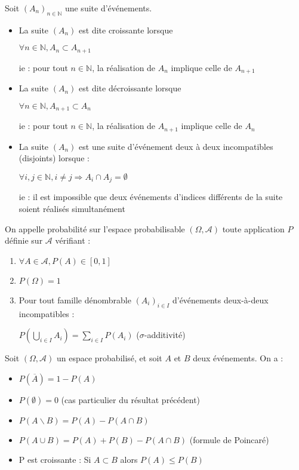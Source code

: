 \documentclass[a4paper,12pt]{book}
\newcommand{\Def}[2]{\begin{tcolorbox}[colback=white,colframe=red!10!green!20!blue!75!, title=Définition : #1]#2\end{tcolorbox}}
\newcommand{\Thr}[2]{\begin{tcolorbox}[sharp corners, colback=white,colframe=red!10!blue!30!green!75!, title=Théorème : #1]#2\end{tcolorbox}}
\def\N{\mathbb{N}}
\begin{document}
\Def{}{Soit $(A_n)_{n\in\N}$ une suite d'événements.\begin{itemize}
\item La suite $(A_n)$ est dite croissante lorsque \par\begin{center}$\forall n\in\N, A_n\subset A_{n+1}$\end{center} \par ie : pour tout $n\in\N$, la réalisation de $A_n$ implique celle de $A_{n+1}$
\item La suite $(A_n)$ est dite décroissante lorsque \par\begin{center}$\forall n\in\N, A_{n+1}\subset A_{n}$\end{center} \par ie : pour tout $n\in\N$, la réalisation de $A_{n+1}$ implique celle de $A_{n}$
\item La suite $(A_n)$ est une suite d'événement deux à deux incompatibles (disjoints) lorsque : \par\begin{center}$\forall i,j\in\N, i\neq j\Rightarrow A_i\cap A_j=\emptyset$\end{center} \par ie : il est impossible que deux événements d'indices différents de la suite soient réalisés simultanément
\end{itemize}}
\Def{}{On appelle probabilité sur l'espace probabilisable $(\Omega,\mathcal{A})$ toute application $P$ définie sur $\mathcal{A}$ vérifiant :\begin{enumerate}
\item $\forall A\in\mathcal{A}, P(A)\in [0,1]$
\item $P(\Omega)=1$
\item Pour tout famille dénombrable $(A_i)_{i\in I}$ d'événements deux-à-deux incompatibles : \par\begin{center}$P\left(\bigcup_{i\in I}A_i\right)=\sum\limits_{i\in I}P(A_i)$ ($\sigma$-additivité)\end{center}
\end{enumerate}}
\Thr{}{Soit $(\Omega,\mathcal{A})$ un espace probabilisé, et soit $A$ et $B$ deux événements. On a :\begin{itemize}
\item $P(\overline{A})=1-P(A)$
\item $P(\emptyset)=0$ (cas particulier du résultat précédent)
\item $P(A\backslash B)=P(A)-P(A\cap B)$
\item $P(A\cup B)=P(A)+P(B)-P(A\cap B)$ (formule de Poincaré)
\item P est croissante : Si $A\subset B$ alors $P(A)\leq P(B)$
\end{itemize}}
\end{document}
